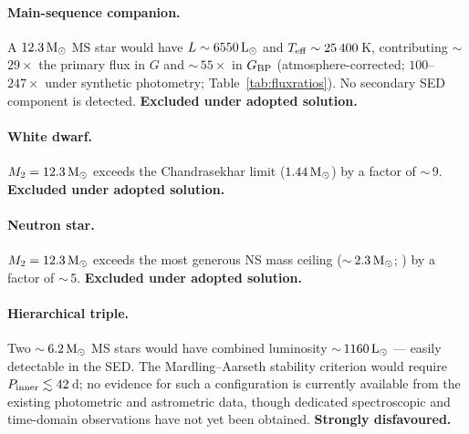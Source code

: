 \documentclass[usenatbib,fleqn]{mnras}
\newcommand{\Msun}{{\rm M}_\odot}
\newcommand{\Lsun}{{\rm L}_\odot}
\begin{document}
\paragraph*{Main-sequence companion.}
A $12.3\,\Msun$ MS star would have $L \sim 6550\,\Lsun$ and
$T_{\rm eff} \sim 25\,400$\,K, contributing $\sim$\,$29\times$ the
primary flux in $G$ and $\sim$\,$55\times$ in $G_{\rm BP}$
(atmosphere-corrected; $100$--$247\times$ under synthetic
photometry; Table~\ref{tab:fluxratios}).
No secondary SED component is detected.  \textbf{Excluded under adopted solution.}

\paragraph*{White dwarf.}
$M_2 = 12.3\,\Msun$ exceeds the Chandrasekhar limit
($1.44\,\Msun$) by a factor of $\sim$\,9.  \textbf{Excluded under adopted solution.}

\paragraph*{Neutron star.}
$M_2 = 12.3\,\Msun$ exceeds the most generous NS mass ceiling
($\sim$\,$2.3\,\Msun$; \citealt{Rezzolla2018}) by a factor of
$\sim$\,5.  \textbf{Excluded under adopted solution.}

\paragraph*{Hierarchical triple.}
Two $\sim$\,$6.2\,\Msun$ MS stars would have combined luminosity
$\sim$\,$1160\,\Lsun$ --- easily detectable in the SED.  The
Mardling--Aarseth stability criterion \citep{MardlingAarseth2001}
would require $P_{\rm inner} \lesssim 42$\,d; no evidence for such
a configuration is currently available from the existing photometric
and astrometric data, though dedicated spectroscopic and
time-domain observations have not yet been obtained.
\textbf{Strongly disfavoured.}
\end{document}
